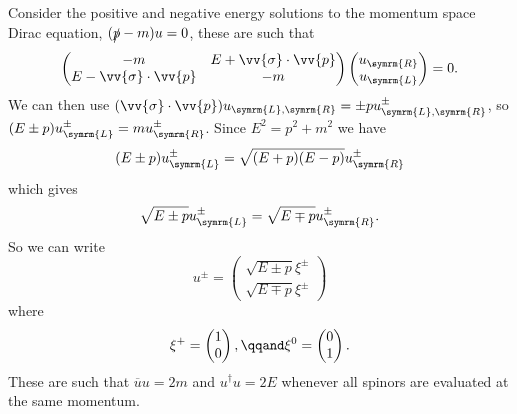 \documentclass[fleqn]{NotesClass}
\newcommand{\diracadjoint}[1]{\overbar{#1}}
\newcommand{\hermit}{\dagger}
\newcommand{\Left}{\symrm{L}}
\newcommand{\Right}{\symrm{R}}
\begin{document}
    Consider the positive and negative energy solutions to the momentum space Dirac equation, \((\slashed{p} - m)u = 0\), these are such that
    \begin{equation}
        \begin{pmatrix}
            -m & E + \vv{\sigma} \cdot \vv{p}\\
            E - \vv{\sigma} \cdot \vv{p} & -m
        \end{pmatrix}
        \begin{pmatrix}
            u_{\Right}\\ u_{\Left}
        \end{pmatrix}
        = 0.
    \end{equation}
    We can then use \((\vv{\sigma} \cdot \vv{p})u_{\Left,\Right} = \pm pu_{\Left,\Right}^{\pm}\), so \((E \pm p)u_{\Left}^{\pm} = mu_{\Right}^{\pm}\).
    Since \(E^2 = p^2 + m^2\) we have
    \begin{equation}
        (E \pm p) u_{\Left}^{\pm} = \sqrt{(E + p)(E - p)}u_{\Right}^{\pm}
    \end{equation}
    which gives
    \begin{equation}
        \sqrt{E \pm p}u_{\Left}^{\pm} = \sqrt{E \mp p}u_{\Right}^{\pm}.
    \end{equation}
    So we can write
    \begin{equation}
        u^{\pm} = 
        \begin{pmatrix}
            \sqrt{E \pm p}\xi^{\pm}\\
            \sqrt{E \mp p}\xi^{\pm}
        \end{pmatrix}
    \end{equation}
    where
    \begin{equation}
        \xi^{+} = 
        \begin{pmatrix}
            1\\ 0
        \end{pmatrix}
        , \qqand \xi^{0} = 
        \begin{pmatrix}
            0\\ 1
        \end{pmatrix}
        .
    \end{equation}
    These are such that \(\diracadjoint{u}u = 2m\) and \(u^\hermit u = 2E\) whenever all spinors are evaluated at the same momentum.
    
\end{document}
